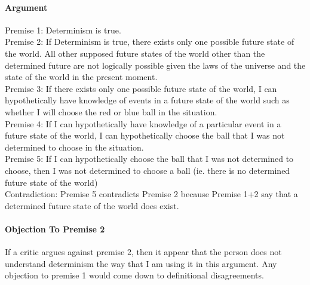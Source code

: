 \documentclass[a4paper, 12pt]{article}
\begin{document}
\paragraph{Argument}
Premise 1: Determinism is true. \\
\break
Premise 2: If Determinism is true, there exists only one possible future state of the world. All other supposed future states of the world other than the determined future are not logically possible given the laws of the universe and the state of the world in the present moment. \\
\break
Premise 3: If there exists only one possible future state of the world, I can hypothetically have knowledge of events in a future state of the world such as whether I will choose the red or blue ball in the situation. \\
\break
Premise 4: If I can hypothetically have knowledge of a particular event in a future state of the world, I can hypothetically choose the ball that I was not determined to choose in the situation. \\
\break
Premise 5: If I can hypothetically choose the ball that I was not determined to choose, then I was not determined to choose a ball (ie. there is no determined future state of the world) \\
\break
Contradiction: Premise 5 contradicts Premise 2 because Premise 1+2 say that a determined future state of the world does exist. \\
\paragraph{Objection To Premise 2}
If a critic argues against premise 2, then it appear that the person does not understand determinism the way that I am using it in this argument. Any objection to premise 1 would come down to definitional disagreements. \\
\end{document}
